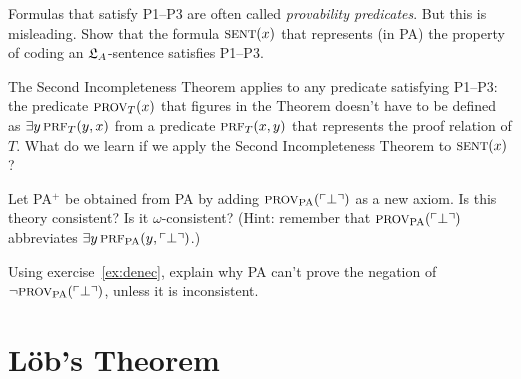 \begin{exercise}
  Formulas that satisfy P1--P3 are often called \emph{provability predicates}.
  But this is misleading.
  Show that the formula $\smallcaps{Sent}(x)$ that
  represents (in PA) the property of coding an $\mathfrak{L}_A$-sentence satisfies P1--P3.
\end{exercise}

\begin{exercise}
  The Second Incompleteness Theorem applies to any predicate satisfying P1--P3:
  the predicate $\smallcaps{prov}_T(x)$ that figures in the Theorem doesn't have to be defined as $\exists y \, \smallcaps{Prf}_T(y,x)$ from a predicate $\smallcaps{Prf}_T(x,y)$ that represents the proof relation of $T$.
  What do we learn if we apply the Second Incompleteness Theorem to $\smallcaps{Sent}(x)$?
\end{exercise}

\begin{exercise}
  Let PA$^+$ be obtained from PA by adding $\smallcaps{Prov}_{\mathrm{PA}}(\gn{\bot})$ as a new axiom.
  Is this theory consistent?
  Is it $\omega$-consistent?
  (Hint: remember that $\smallcaps{Prov}_{\mathrm{PA}}(\gn{\bot})$ abbreviates $\exists y \, \smallcaps{Prf}_{\mathrm{PA}}(y,\gn{\bot})$.)
\end{exercise}

\begin{exercise}
  Using exercise~\ref{ex:denec},
  explain why PA can't prove the negation of $\neg \smallcaps{Prov}_{\mathrm{PA}}(\gn{\bot})$,
  unless it is inconsistent.
\end{exercise}


\section{Löb's Theorem}
\label{sec:lobs-theorem}

